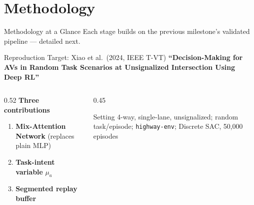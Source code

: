 \documentclass[aspectratio=169,10pt]{beamer}
\begin{document}
\section{Methodology}

\begin{frame}{Methodology at a Glance}
	\centering
	\vspace{14pt}
	\small Each stage builds on the previous milestone's validated pipeline --- detailed next.
\end{frame}

\begin{frame}{Reproduction Target: Xiao et al.\ (2024, IEEE T-VT)}
	\small \textbf{``Decision-Making for AVs in Random Task Scenarios at Unsignalized Intersection Using Deep RL''}
	\vspace{8pt}
	\begin{columns}[T]
		\begin{column}{0.52\textwidth}
			\textbf{Three contributions}
			\begin{enumerate}
				\item \textbf{Mix-Attention Network} (replaces plain MLP)
				\item \textbf{Task-intent variable} $\mu_a$
				\item \textbf{Segmented replay buffer}
			\end{enumerate}
		\end{column}
		\begin{column}{0.45\textwidth}
			\begin{block}{Setting}
				\small 4-way, single-lane, unsignalized; random task/episode; \texttt{highway-env}; Discrete SAC, 50{,}000 episodes
			\end{block}
		\end{column}
	\end{columns}
\end{frame}
\end{document}
